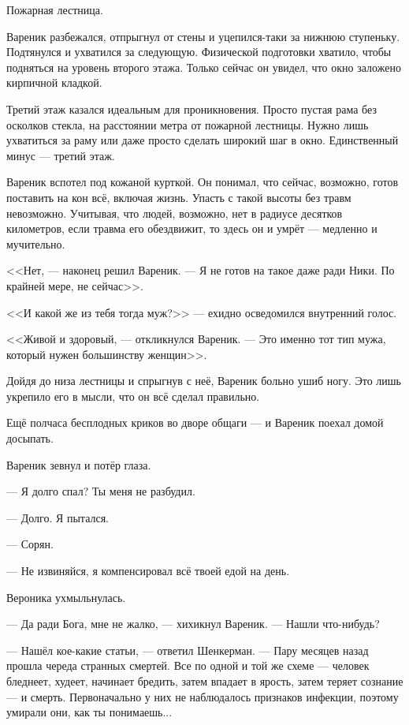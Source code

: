 Пожарная лестница.

Вареник разбежался, отпрыгнул от стены и уцепился-таки за нижнюю ступеньку.
Подтянулся и ухватился за следующую.
Физической подготовки хватило, чтобы подняться на уровень второго этажа.
Только сейчас он увидел, что окно заложено кирпичной кладкой.

Третий этаж казался идеальным для проникновения.
Просто пустая рама без осколков стекла, на расстоянии метра от пожарной лестницы.
Нужно лишь ухватиться за раму или даже просто сделать широкий шаг в окно.
Единственный минус --- третий этаж.

Вареник вспотел под кожаной курткой.
Он понимал, что сейчас, возможно, готов поставить на кон всё, включая жизнь.
Упасть с такой высоты без травм невозможно.
Учитывая, что людей, возможно, нет в радиусе десятков километров, если травма его обездвижит, то здесь он и умрёт --- медленно и мучительно.

<<Нет, --- наконец решил Вареник.
--- Я не готов на такое даже ради Ники.
По крайней мере, не сейчас>>.

<<И какой же из тебя тогда муж?>> --- ехидно осведомился внутренний голос.

<<Живой и здоровый, --- откликнулся Вареник.
--- Это именно тот тип мужа, который нужен большинству женщин>>.

Дойдя до низа лестницы и спрыгнув с неё, Вареник больно ушиб ногу.
Это лишь укрепило его в мысли, что он всё сделал правильно.

Ещё полчаса бесплодных криков во дворе общаги --- и Вареник поехал домой досыпать.

\asterism

\textspace

Вареник зевнул и потёр глаза.

--- Я долго спал?
Ты меня не разбудил.

--- Долго.
Я пытался.

--- Сорян.

--- Не извиняйся, я компенсировал всё твоей едой на день.

Вероника ухмыльнулась.

--- Да ради Бога, мне не жалко, --- хихикнул Вареник.
--- Нашли что-нибудь?

--- Нашёл кое-какие статьи, --- ответил Шенкерман.
--- Пару месяцев назад прошла череда странных смертей.
Все по одной и той же схеме --- человек бледнеет, худеет, начинает бредить, затем впадает в ярость, затем теряет сознание --- и смерть.
Первоначально у них не наблюдалось признаков инфекции, поэтому умирали они, как ты понимаешь...

